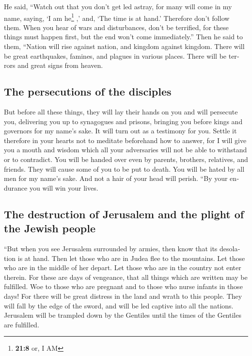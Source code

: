 \begin{paracol}{2}
\begin{otherlanguage}{english}
\begin{otherlanguage}{english}
 He said, ``Watch out that you don't get led astray, for
many will come in my name, saying, `I am he\footnote{\textbf{21:8} or, I
  AM} ,' and, `The time is at hand.' Therefore don't follow them.
 When you hear of wars and disturbances, don't be
terrified, for these things must happen first, but the end won't come
immediately.''  Then he said to them, ``Nation will rise
against nation, and kingdom against kingdom.  There will
be great earthquakes, famines, and plagues in various places. There will
be terrors and great signs from heaven.

\hypertarget{the-persecutions-of-the-disciples}{%
\subsection{The persecutions of the
disciples}\label{the-persecutions-of-the-disciples}}

 But before all these things, they will lay their hands
on you and will persecute you, delivering you up to synagogues and
prisons, bringing you before kings and governors for my name's sake.
 It will turn out as a testimony for you. 
Settle it therefore in your hearts not to meditate beforehand how to
answer,  for I will give you a mouth and wisdom which all
your adversaries will not be able to withstand or to contradict.
 You will be handed over even by parents, brothers,
relatives, and friends. They will cause some of you to be put to death.
 You will be hated by all men for my name's sake.
 And not a hair of your head will perish. 
``By your endurance you will win your lives.

\hypertarget{the-destruction-of-jerusalem-and-the-plight-of-the-jewish-people}{%
\subsection{The destruction of Jerusalem and the plight of the Jewish
people}\label{the-destruction-of-jerusalem-and-the-plight-of-the-jewish-people}}

 ``But when you see Jerusalem surrounded by armies, then
know that its desolation is at hand.  Then let those who
are in Judea flee to the mountains. Let those who are in the middle of
her depart. Let those who are in the country not enter therein.
 For these are days of vengeance, that all things which
are written may be fulfilled.  Woe to those who are
pregnant and to those who nurse infants in those days! For there will be
great distress in the land and wrath to this people. 
They will fall by the edge of the sword, and will be led captive into
all the nations. Jerusalem will be trampled down by the Gentiles until
the times of the Gentiles are fulfilled.


\end{otherlanguage}
\end{otherlanguage}
\end{paracol}
